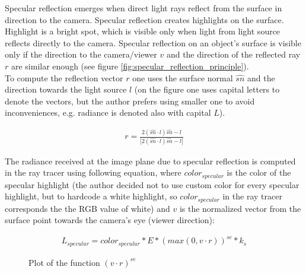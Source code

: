 \documentclass{article}
\begin{document}
Specular reflection emerges when direct light rays reflect from the surface in direction to the camera. Specular reflection creates highlights on the surface. Highlight is a bright spot, which is visible only when light from light source reflects directly to the camera. Specular reflection on an object's surface is visible only if the direction to the camera/viewer $v$ and the direction of the reflected ray $r$ are similar enough (see figure \ref{fig:specular_reflection_principle}).\\
To compute the reflection vector $r$ one uses the surface normal $\hat{sn}$ and the direction towards the light source $l$ (on the figure one uses capital letters to denote the vectors, but the author prefers using smaller one to avoid inconveniences, e.g. radiance is denoted also with capital $L$). 

\begin{align}
r = \frac{2(\hat{sn} \cdot l)\hat{sn} - l}{|2(\hat{sn} \cdot l)\hat{sn} - l|}
\label{eq:reflection_vector}
\end{align}

The radiance received at the image plane due to specular reflection is computed in the ray tracer using following equation, where $color_{specular}$ is the color of the specular highlight (the author decided not to use custom color for every specular highlight, but to hardcode a white highlight, so $color_{specular}$ in the ray tracer corresponds the the RGB value of white) and $v$ is the normalized vector from the surface point towards the camera's eye (viewer direction):

\begin{align}
L_{specular} = color_{specular} * E * (max(0, v \cdot r))^{se} * k_{s}
\end{align}

\begin{figure}[h]
\centering
{}
\caption{Plot of the function $(v \cdot r)^{se}$}
\label{fig:plot_se}
\end{figure}
\end{document}
